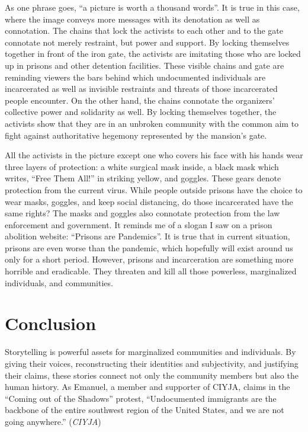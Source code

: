 \documentclass[12pt]{article}
\begin{document}
\begin{flushleft}
As one phrase goes, ``a picture is worth a thousand words''. It is true in this case, where the image conveys more messages with its denotation as well as connotation. The chains that lock the activists to each other and to the gate connotate not merely restraint, but power and support. By locking themselves together in front of the iron gate, the activists are imitating those who are locked up in prisons and other detention facilities. These visible chains and gate are reminding viewers the bars behind which undocumented individuals are incarcerated as well as invisible restraints and threats of those incarcerated people encounter. On the other hand, the chains connotate the organizers' collective power and solidarity as well. By locking themselves together, the activists show that they are in an unbroken community with the common aim to fight against authoritative hegemony represented by the mansion's gate. 

All the activists in the picture except one who covers his face with his hands wear three layers of protection: a white surgical mask inside, a black mask which writes, ``Free Them All!'' in striking yellow, and goggles. These gears denote protection from the current virus. While people outside prisons have the choice to wear masks, goggles, and keep social distancing, do those incarcerated have the same rights? The masks and goggles also connotate protection from the law enforcement and government. It reminds me of a slogan I saw on a prison abolition website: ``Prisons are Pandemics''. It is true that in current situation, prisons are even worse than the pandemic, which hopefully will exist around us only for a short period. However, prisons and incarceration are something more horrible and eradicable. They threaten and kill all those powerless, marginalized individuals, and communities. 

\section*{Conclusion}

Storytelling is powerful assets for marginalized communities and individuals. By giving their voices, reconstructing their identities and subjectivity, and justifying their claims, these stories connect not only the community members but also the human history. As Emanuel, a member and supporter of CIYJA, claims in the ``Coming out of the Shadows'' protest, ``Undocumented immigrants are the backbone of the entire southwest region of the United States, and we are not going anywhere.'' (\textit{CIYJA})


\end{flushleft}
\end{document}

